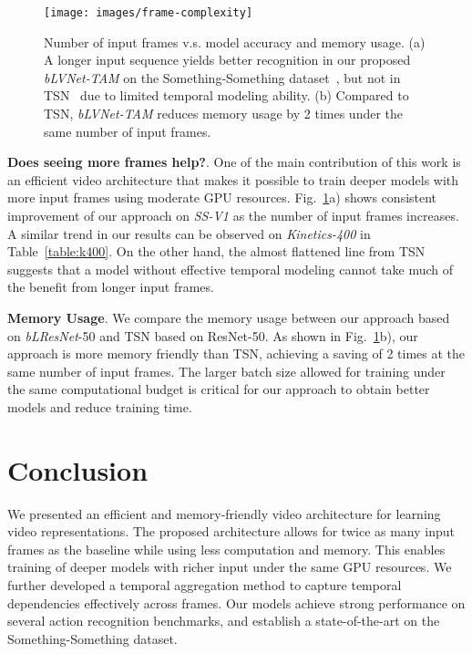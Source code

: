 \documentclass{article}
\def\blresnet{\textit{bLResNet}\xspace}
\def\DTA{\textit{bLVNet-TAM}\xspace}
\def\K400{\textit{Kinetics-400}\xspace}
\def\SSVone{\textit{SS-V1}\xspace}
\begin{document}
\begin{figure}[t!]
    \vspace{-10pt}
    \centering
    \texttt{[image: images/frame-complexity]}
    \vspace{-10pt}
    \caption{Number of input frames v.s. model accuracy and memory usage. (a) A longer input sequence yields better recognition in our proposed \DTA on the Something-Something dataset~\cite{Something:goyal2017something}, but not in TSN~\cite{TSN:wang2016temporal} due to limited temporal modeling ability. (b) Compared to TSN, \DTA reduces memory usage by 2 times under the same number of input frames.}
    \label{fig:frame-complexity}
    \vspace{-10pt}
\end{figure}


\textbf{Does seeing more frames help?}. One of the main contribution of this work is an efficient video architecture that makes it possible to train deeper models with more input frames using moderate GPU resources. Fig.~\ref{fig:frame-complexity}a) shows consistent improvement of our approach on \SSVone as the number of input frames increases. A similar trend in our results can be observed on \K400 in Table~\ref{table:k400}. On the other hand, the almost flattened line from TSN suggests that a model without effective temporal modeling cannot take much of the benefit from longer input frames. 

\textbf{Memory Usage}. We compare the memory usage between our approach based on \blresnet-50 and TSN based on ResNet-50. As shown in Fig.~\ref{fig:frame-complexity}b), our approach is more memory friendly than TSN, achieving a saving of 2 times at the same number of input frames.
The larger batch size allowed for training under the same computational budget is critical for our approach to obtain better models and reduce training time.
 \section{Conclusion}
\label{sec:conclusion}
We presented an efficient and memory-friendly video architecture for learning video representations. The proposed architecture allows for twice as many input frames as the baseline while using less computation and memory. This enables training of deeper models with richer input under the same GPU resources. We further developed a temporal aggregation method to capture temporal dependencies effectively across frames. Our models achieve strong performance on several action recognition benchmarks, and establish a state-of-the-art on the Something-Something dataset.  
{\small


}
\end{document}
